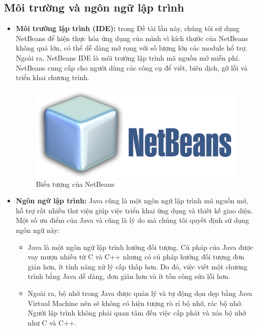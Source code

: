 \documentclass[12pt]{report}
\begin{document}
				\subsection{Môi trường và ngôn ngữ lập trình}
					\begin{itemize}
						\item{\textbf{Môi trường lập trình (IDE):}} trong Đề tài lần này, chúng tôi sử dụng NetBeans để hiện thực hóa ứng dụng của mình vì kích thước của NetBeans không quá lớn, có thể dễ dàng mở rọng với số lượng lớn các module hổ trợ. Ngoài ra, NetBeans IDE là môi trường lập trình mã nguồn mở miễn phí. NetBeans cung cấp cho người dùng các công cụ để viết, biên dịch, gỡ lỗi và triển khai chương trình.
					\begin{figure}[H]
					\centering
					\includegraphics[scale=0.7]{images/NetBeans.png}
					\caption[Biểu tượng của NetBeans]{Biểu tượng của NetBeans\protect\footnotemark{}}
					\label{fig:NetBeans}
					\end{figure}
					\item{\textbf{Ngôn ngữ lập trình:}} Java cũng là một ngôn ngữ lập trình mã nguồn mở, hỗ trợ rất nhiều thư viện giúp việc triển khai ứng dụng và thiết kế giao diện. Một số ưu điểm của Java và cũng là lý do mà chúng tôi quyết định sử dụng ngôn ngữ này:
						\begin{itemize}
							\item{Java là một ngôn ngữ lập trình hướng đối tượng. Cú pháp của Java được vay mượn nhiều từ C và C++ nhưng có cú pháp hướng đối tượng đơn giản hơn, ít tính năng xử lý cấp thấp hơn. Do đó, việc viết một chương trình bằng Java dễ dàng, đơn giản hơn và ít tốn công sửa lỗi hơn.}
							\item{Ngoài ra, bộ nhớ trong Java được quản lý và tự động dọn dẹp bằng Java Virtual Machine nên sẽ không có hiện tượng rò rỉ bộ nhớ, rác bộ nhớ. Người lập trình không phải quan tâm đến việc cấp phát và xóa bộ nhớ như C và C++.}
						\end{itemize}

\end{itemize}
\end{document}
